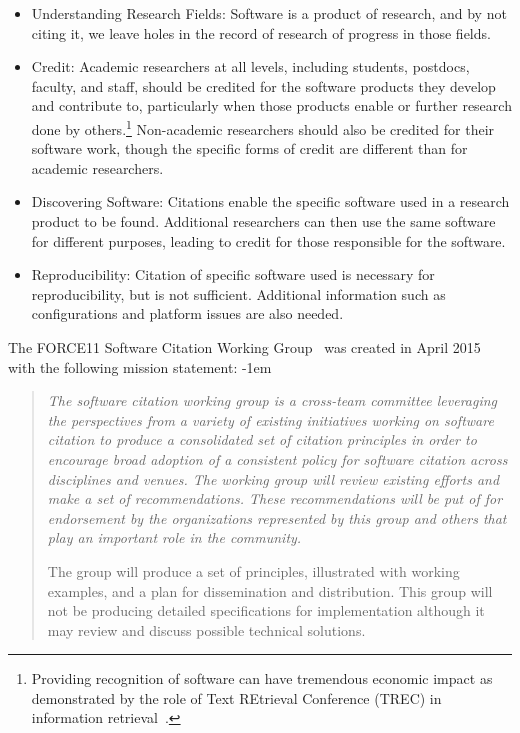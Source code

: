 \documentclass[11pt, oneside]{amsart}
\newenvironment{italicquotes}
{\begin{quote}\itshape}
{\end{quote}}
\begin{document}
\begin{itemize}
\item Understanding Research Fields: Software is a product of research, and by not
citing it, we leave holes in the record of research of progress in those fields.

\item Credit: Academic researchers at all levels, including students,
postdocs, faculty, and staff, should be credited for the software products they
develop and contribute to, particularly when those products enable or further
research done by others.\footnote{Providing recognition of software can have tremendous economic impact as demonstrated by the role of Text REtrieval Conference (TREC) in information retrieval~\cite{trec-economic-impact}.}
Non-academic researchers should also be credited for their software
work, though the specific forms of credit are different than for academic researchers.

\item Discovering Software: Citations enable the specific software used in a
research product to be found. Additional researchers can then use the same
software for different purposes, leading to credit for those responsible for the
software.

\item Reproducibility: Citation of specific software used is necessary for
reproducibility, but is not sufficient. Additional information such as
configurations and platform issues are also needed.

\end{itemize}


The FORCE11 Software Citation Working Group~\cite{f11scwg} was created in April
2015 with the following mission statement:
\advance\leftmargini -1em
\begin{italicquotes}
The software citation working group is a cross-team committee leveraging the
perspectives from a variety of existing initiatives working on software citation
to produce a consolidated set of citation principles in order to encourage broad
adoption of a consistent policy for software citation across disciplines and
venues. The working group will review existing efforts and make a set of
recommendations. These recommendations will be put of for endorsement by the
organizations represented by this group and others that play an important role
in the community.

The group will produce a set of principles, illustrated with working examples,
and a plan for dissemination and distribution. This group will not be producing
detailed specifications for implementation although it may review and discuss
possible technical solutions.
\end{italicquotes}
\end{document}
